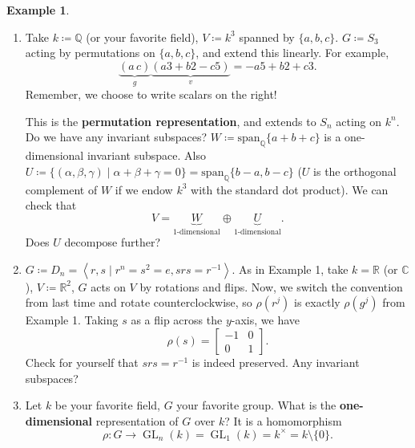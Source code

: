 \documentclass[12pt]{article}
\newcommand{\q}{\mathbb{Q}}
\newcommand{\cx}{\mathbb{C}}
\newcommand{\real}{\mathbb{R}}
\newcommand\inv[1]{#1^{-1}}
\newcommand{\vbrack}[1]{\left \langle #1 \right \rangle}
\theoremstyle{definition}
\newtheorem{example}{Example}[section]
\DeclareMathOperator\GL{GL}
\begin{document}
\begin{example}
\begin{enumerate}
        In this example, does $\real^2$ have any (nontrivial proper) invariant subspaces? It would be a line that is fixed under rotation. Unless $\theta=k\pi$, in which case every line is invariant, there are none. What about $\cx$?
        \item Take $k\coloneqq \q$ (or your favorite field), $V\coloneqq k^3$ spanned by $\{a,b,c\}$. $G\coloneqq S_3$ acting by permutations on $\{a,b,c\}$, and extend this linearly. For example, 
        \begin{equation}
            \underbrace{(a\,c)}_{g}\underbrace{(a3+b2-c5)}_{v}=-a5+b2+c3.
        \end{equation}
        Remember, we choose to write scalars on the right!
        
        This is the \textbf{permutation representation}, and extends to $S_n$ acting on $k^n$. Do we have any invariant subspaces? $W\coloneqq \mathrm{span}_{\q}\{a+b+c\}$ is a one-dimensional invariant subspace. Also $U\coloneqq \{(\alpha,\beta,\gamma)\mid\alpha+\beta+\gamma=0\}=\mathrm{span}_{\q}\{b-a,b-c\}$ ($U$ is the orthogonal complement of $W$ if we endow $k^3$ with the standard dot product). We can check that 
        \begin{equation}
            V=\underbrace{W}_{1\text{-dimensional}}\oplus\underbrace{U}_{1\text{-dimensional}}.
        \end{equation}
        Does $U$ decompose further?
        \item $G\coloneqq D_n=\vbrack{r,s\mid r^n=s^2=e,srs=\inv{r}}$. As in Example 1, take $k=\real$ (or $\cx$), $V\coloneqq \real^2$, $G$ acts on $V$ by rotations and flips. Now, we switch the convention from last time and rotate counterclockwise, so $\rho(r^j)$ is exactly $\rho(g^j)$ from Example 1. Taking $s$ as a flip across the $y$-axis, we have
        \begin{equation}
            \rho(s)=
            \begin{bmatrix}
                -1 & 0 \\
                0 & 1
            \end{bmatrix}.
        \end{equation}
        Check for yourself that $srs=r^{-1}$ is indeed preserved. Any invariant subspaces?
        \item Let $k$ be your favorite field, $G$ your favorite group. What is the \textbf{one-dimensional} representation of $G$ over $k$? It is a homomorphism
        \begin{equation}
            \rho:G\to\GL_n(k)=\GL_1(k)=k^{\times}=k\setminus\{0\}.

\end{equation}
\end{enumerate}
\end{example}
\end{document}
